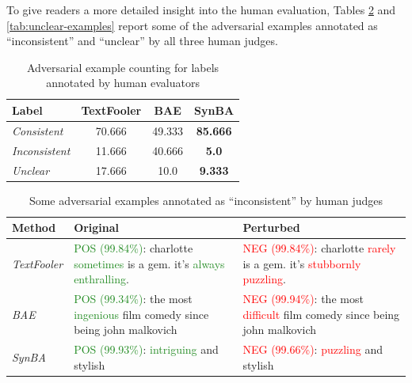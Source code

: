 To give readers a more detailed insight into the human evaluation, Tables \ref{tab:inconsistent-examples} and \ref{tab:unclear-examples} report some of the adversarial examples annotated as “inconsistent” and “unclear” by all three human judges.

\begin{table}[h]
    \footnotesize
    \centering
    \begin{tabular}{|l|c|c|c|}
        \hline
        \textbf{Label} &            \textbf{TextFooler} &   \textbf{BAE} &    \textbf{SynBA} \\
        \hline \hline
        \emph{Consistent}            &  70.666 &   49.333 &   \textbf{85.666} \\
        \hline
        \emph{Inconsistent}               &  11.666 &   40.666 &  \textbf{5.0}  \\
        \hline
        \emph{Unclear}    &  17.666 &   10.0 &  \textbf{9.333}\\
        \hline
        \end{tabular}
    \caption{Adversarial example counting for labels annotated by human evaluators}
    \label{tab:human-evaluation}
\end{table}


\begin{table}[h]
    \footnotesize
    \centering
    \begin{tabularx}{\textwidth}{|l||X|X|}
    \hline
    \textbf{Method}   &   \textbf{Original}    &   \textbf{Perturbed}\\ \hline\hline
    \emph{TextFooler} & \textcolor{ForestGreen}{POS (99.84\%)}: charlotte \textcolor{ForestGreen}{sometimes} is a gem. it's \textcolor{ForestGreen}{always enthralling}.  & \textcolor{red}{NEG (99.84\%)}: charlotte \textcolor{red}{rarely} is a gem. it's \textcolor{red}{stubbornly puzzling}. \\ \hline
    \emph{BAE} &  \textcolor{ForestGreen}{POS (99.34\%)}: the most \textcolor{ForestGreen}{ingenious} film comedy since being john malkovich  & \textcolor{red}{NEG (99.94\%)}: the most \textcolor{red}{difficult} film comedy since being john malkovich \\ \hline
    \emph{SynBA} & \textcolor{ForestGreen}{POS (99.93\%)}: \textcolor{ForestGreen}{intriguing} and stylish  & \textcolor{red}{NEG (99.66\%)}: \textcolor{red}{puzzling} and stylish  \\ \hline
\end{tabularx}
    \caption{Some adversarial examples annotated as “inconsistent” by human judges}
    \label{tab:inconsistent-examples}
\end{table}

